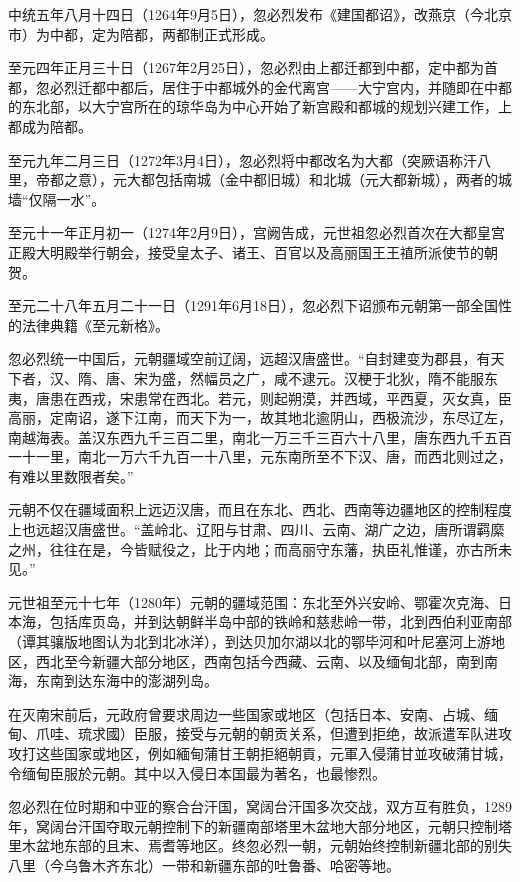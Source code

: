 中统五年八月十四日（1264年9月5日），忽必烈发布《建国都诏》，改燕京（今北京市）为中都，定为陪都，两都制正式形成。

至元四年正月三十日（1267年2月25日），忽必烈由上都迁都到中都，定中都为首都，忽必烈迁都中都后，居住于中都城外的金代离宫——大宁宫内，并随即在中都的东北部，以大宁宫所在的琼华岛为中心开始了新宫殿和都城的规划兴建工作，上都成为陪都。

至元九年二月三日（1272年3月4日），忽必烈将中都改名为大都（突厥语称汗八里，帝都之意），元大都包括南城（金中都旧城）和北城（元大都新城），两者的城墙“仅隔一水”。

至元十一年正月初一（1274年2月9日），宫阙告成，元世祖忽必烈首次在大都皇宫正殿大明殿举行朝会，接受皇太子、诸王、百官以及高丽国王王禃所派使节的朝贺。

至元二十八年五月二十一日（1291年6月18日），忽必烈下诏颁布元朝第一部全国性的法律典籍《至元新格》。

忽必烈统一中国后，元朝疆域空前辽阔，远超汉唐盛世。“自封建变为郡县，有天下者，汉、隋、唐、宋为盛，然幅员之广，咸不逮元。汉梗于北狄，隋不能服东夷，唐患在西戎，宋患常在西北。若元，则起朔漠，并西域，平西夏，灭女真，臣高丽，定南诏，遂下江南，而天下为一，故其地北逾阴山，西极流沙，东尽辽左，南越海表。盖汉东西九千三百二里，南北一万三千三百六十八里，唐东西九千五百一十一里，南北一万六千九百一十八里，元东南所至不下汉、唐，而西北则过之，有难以里数限者矣。”

元朝不仅在疆域面积上远迈汉唐，而且在东北、西北、西南等边疆地区的控制程度上也远超汉唐盛世。“盖岭北、辽阳与甘肃、四川、云南、湖广之边，唐所谓羁縻之州，往往在是，今皆赋役之，比于内地；而高丽守东藩，执臣礼惟谨，亦古所未见。”

元世祖至元十七年（1280年）元朝的疆域范围：东北至外兴安岭、鄂霍次克海、日本海，包括库页岛，并到达朝鲜半岛中部的铁岭和慈悲岭一带，北到西伯利亚南部（谭其骧版地图认为北到北冰洋），到达贝加尔湖以北的鄂毕河和叶尼塞河上游地区，西北至今新疆大部分地区，西南包括今西藏、云南、以及缅甸北部，南到南海，东南到达东海中的澎湖列岛。

在灭南宋前后，元政府曾要求周边一些国家或地区（包括日本、安南、占城、缅甸、爪哇、琉求國）臣服，接受与元朝的朝贡关系，但遭到拒绝，故派遣军队进攻攻打这些国家或地区，例如緬甸蒲甘王朝拒絕朝貢，元軍入侵蒲甘並攻破蒲甘城，令缅甸臣服於元朝。其中以入侵日本国最为著名，也最惨烈。

忽必烈在位时期和中亚的察合台汗国，窝阔台汗国多次交战，双方互有胜负，1289年，窝阔台汗国夺取元朝控制下的新疆南部塔里木盆地大部分地区，元朝只控制塔里木盆地东部的且末、焉耆等地区。终忽必烈一朝，元朝始终控制新疆北部的别失八里（今乌鲁木齐东北）一带和新疆东部的吐鲁番、哈密等地。

